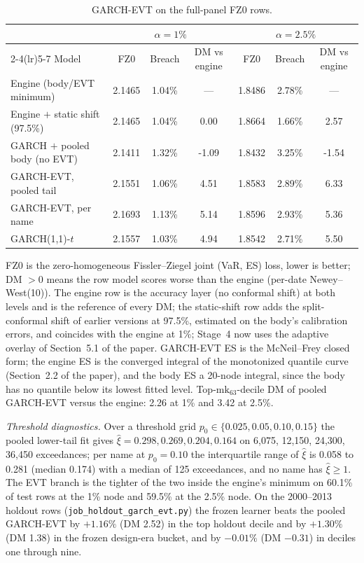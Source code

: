 \documentclass[11pt]{article}
\begin{document}
\begin{table}[htbp]
\centering
\begin{threeparttable}
\caption{GARCH-EVT on the full-panel FZ0 rows.}
\label{tab:garchevt-fz0}
\small
\begin{tabular}{lcccccc}
\toprule
& \multicolumn{3}{c}{$\alpha=1\%$} & \multicolumn{3}{c}{$\alpha=2.5\%$} \\
\cmidrule(lr){2-4}\cmidrule(lr){5-7}
Model & FZ0 & Breach & DM vs engine & FZ0 & Breach & DM vs engine \\
\midrule
Engine (body/EVT minimum) & 2.1465 & 1.04\% & --- & 1.8486 & 2.78\% & --- \\
Engine $+$ static shift (97.5\%) & 2.1465 & 1.04\% & 0.00 & 1.8664 & 1.66\% & 2.57 \\
GARCH $+$ pooled body (no EVT) & 2.1411 & 1.32\% & -1.09 & 1.8432 & 3.25\% & -1.54 \\
GARCH-EVT, pooled tail & 2.1551 & 1.06\% & 4.51 & 1.8583 & 2.89\% & 6.33 \\
GARCH-EVT, per name & 2.1693 & 1.13\% & 5.14 & 1.8596 & 2.93\% & 5.36 \\
GARCH(1,1)-$t$ & 2.1557 & 1.03\% & 4.94 & 1.8542 & 2.71\% & 5.50 \\
\bottomrule
\end{tabular}
\begin{tablenotes}\footnotesize
\item FZ0 is the zero-homogeneous Fissler--Ziegel joint (VaR, ES) loss, lower is better; DM $>0$ means the row model scores worse than the engine (per-date Newey--West(10)). The engine row is the accuracy layer (no conformal shift) at both levels and is the reference of every DM; the static-shift row adds the split-conformal shift of earlier versions at 97.5\%, estimated on the body's calibration errors, and coincides with the engine at 1\%; Stage~4 now uses the adaptive overlay of Section~5.1 of the paper. GARCH-EVT ES is the McNeil--Frey closed form; the engine ES is the converged integral of the monotonized quantile curve (Section~2.2 of the paper), and the body ES a 20-node integral, since the body has no quantile below its lowest fitted level. Top-$\mathrm{mk}_{63}$-decile DM of pooled GARCH-EVT versus the engine: 2.26 at 1\% and 3.42 at 2.5\%.
\end{tablenotes}
\end{threeparttable}
\end{table}

\noindent\emph{Threshold diagnostics.} Over a threshold grid $p_0\in\{0.025,0.05,0.10,0.15\}$ the pooled lower-tail fit gives $\hat\xi=0.298, 0.269, 0.204, 0.164$ on 6,075, 12,150, 24,300, 36,450 exceedances; per name at $p_0=0.10$ the interquartile range of $\hat\xi$ is 0.058 to 0.281 (median 0.174) with a median of 125 exceedances, and no name has $\hat\xi\ge1$. The EVT branch is the tighter of the two inside the engine's minimum on 60.1\% of test rows at the 1\% node and 59.5\% at the 2.5\% node. On the 2000--2013 holdout rows (\texttt{job\_holdout\_garch\_evt.py}) the frozen learner beats the pooled GARCH-EVT by $+1.16\%$ (DM 2.52) in the top holdout decile and by $+1.30\%$ (DM 1.38) in the frozen design-era bucket, and by $-0.01\%$ (DM $-0.31$) in deciles one through nine.
\end{document}
